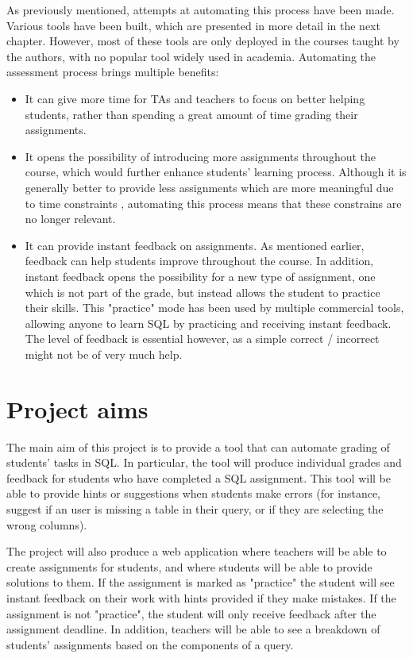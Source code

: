 As previously mentioned, attempts at automating this process have been made. Various tools have been built, which are presented in more detail in the next chapter. However, most of these tools are only deployed in the courses taught by the authors, with no popular tool widely used in academia. Automating the assessment process brings multiple benefits:
\begin{itemize}
    \item It can give more time for TAs and teachers to focus on better helping students, rather than spending a great amount of time grading their assignments.
    \item It opens the possibility of introducing more assignments throughout the course, which would further enhance students' learning process. Although it is generally better to provide less assignments which are more meaningful due to time constraints \citep{literature:assement}, automating this process means that these constrains are no longer relevant.
    \item It can provide instant feedback on assignments. As mentioned earlier, feedback can help students improve throughout the course. In addition, instant feedback opens the possibility for a new type of assignment, one which is not part of the grade, but instead allows the student to practice their skills. This "practice" mode has been used by multiple commercial tools, allowing anyone to learn SQL by practicing and receiving instant feedback. The level of feedback is essential however, as a simple correct / incorrect might not be of very much help.
\end{itemize}


\section{Project aims} \label{ch:introduction:sec:project_aims}

The main aim of this project is to provide a tool that can automate grading of students' tasks in SQL. In particular, the tool will produce individual grades and feedback for students who have completed a SQL assignment. This tool will be able to provide hints or suggestions when students make errors (for instance, suggest if an user is missing a table in their query, or if they are selecting the wrong columns).

The project will also produce a web application where teachers will be able to create assignments for students, and where students will be able to provide solutions to them. If the assignment is marked as "practice" the student will see instant feedback on their work with hints provided if they make mistakes. If the assignment is not "practice", the student will only receive feedback after the assignment deadline. In addition, teachers will be able to see a breakdown of students' assignments based on the components of a query.

